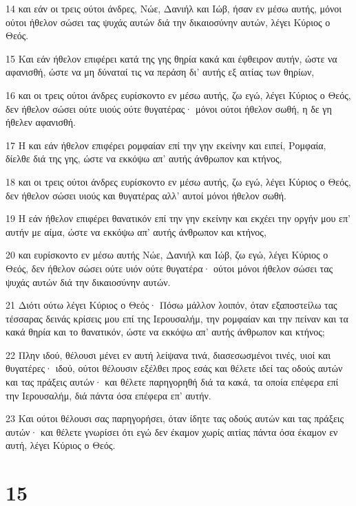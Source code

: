 \par 14 και εάν οι τρεις ούτοι άνδρες, Νώε, Δανιήλ και Ιώβ, ήσαν εν μέσω αυτής, μόνοι ούτοι ήθελον σώσει τας ψυχάς αυτών διά την δικαιοσύνην αυτών, λέγει Κύριος ο Θεός.
\par 15 Και εάν ήθελον επιφέρει κατά της γης θηρία κακά και έφθειρον αυτήν, ώστε να αφανισθή, ώστε να μη δύναταί τις να περάση δι' αυτής εξ αιτίας των θηρίων,
\par 16 και οι τρεις ούτοι άνδρες ευρίσκοντο εν μέσω αυτής, ζω εγώ, λέγει Κύριος ο Θεός, δεν ήθελον σώσει ούτε υιούς ούτε θυγατέρας· μόνοι ούτοι ήθελον σωθή, η δε γη ήθελεν αφανισθή.
\par 17 Η και εάν ήθελον επιφέρει ρομφαίαν επί την γην εκείνην και ειπεί, Ρομφαία, δίελθε διά της γης, ώστε να εκκόψω απ' αυτής άνθρωπον και κτήνος,
\par 18 και οι τρεις ούτοι άνδρες ευρίσκοντο εν μέσω αυτής, ζω εγώ, λέγει Κύριος ο Θεός, δεν ήθελον σώσει υιούς και θυγατέρας αλλ' αυτοί μόνοι ήθελον σωθή.
\par 19 Η εάν ήθελον επιφέρει θανατικόν επί την γην εκείνην και εκχέει την οργήν μου επ' αυτήν με αίμα, ώστε να εκκόψω απ' αυτής άνθρωπον και κτήνος,
\par 20 και ευρίσκοντο εν μέσω αυτής Νώε, Δανιήλ και Ιώβ, ζω εγώ, λέγει Κύριος ο Θεός, δεν ήθελον σώσει ούτε υιόν ούτε θυγατέρα· ούτοι μόνοι ήθελον σώσει τας ψυχάς αυτών διά την δικαιοσύνην αυτών.
\par 21 Διότι ούτω λέγει Κύριος ο Θεός· Πόσω μάλλον λοιπόν, όταν εξαποστείλω τας τέσσαρας δεινάς κρίσεις μου επί της Ιερουσαλήμ, την ρομφαίαν και την πείναν και τα κακά θηρία και το θανατικόν, ώστε να εκκόψω απ' αυτής άνθρωπον και κτήνος;
\par 22 Πλην ιδού, θέλουσι μένει εν αυτή λείψανα τινά, διασεσωσμένοι τινές, υιοί και θυγατέρες· ιδού, ούτοι θέλουσιν εξέλθει προς εσάς και θέλετε ιδεί τας οδούς αυτών και τας πράξεις αυτών· και θέλετε παρηγορηθή διά τα κακά, τα οποία επέφερα επί την Ιερουσαλήμ, διά πάντα όσα επέφερα επ' αυτήν.
\par 23 Και ούτοι θέλουσι σας παρηγορήσει, όταν ίδητε τας οδούς αυτών και τας πράξεις αυτών· και θέλετε γνωρίσει ότι εγώ δεν έκαμον χωρίς αιτίας πάντα όσα έκαμον εν αυτή, λέγει Κύριος ο Θεός.

\chapter{15}

